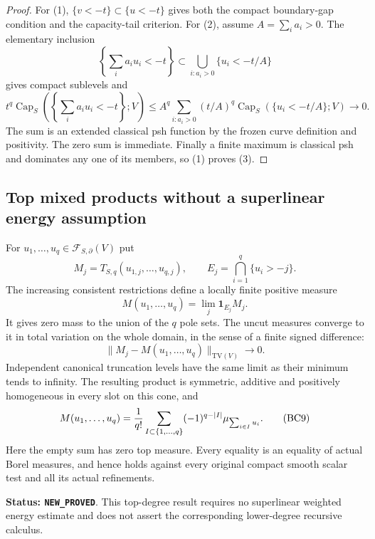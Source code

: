 \begin{proof}
For (1), $\{v<-t\}\subset\{u<-t\}$ gives both the compact
boundary-gap condition and the capacity-tail criterion.
For (2), assume $A=\sum_i a_i>0$. The elementary inclusion
\[
 \left\{\sum_i a_i u_i<-t\right\}
                  \subset\bigcup_{i:a_i>0}\{u_i<-t/A\}
 \tag{BC6}
\]
gives compact sublevels and
\[
 t^q\operatorname{Cap}_S
          \left(\left\{\sum_i a_i u_i<-t\right\};V\right)
 \leq A^q\sum_{i:a_i>0}
       (t/A)^q\operatorname{Cap}_S(\{u_i<-t/A\};V)
                       \longrightarrow0.
\]
The sum is an extended classical psh function by the frozen
curve definition and positivity. The zero sum is immediate.
Finally a finite maximum is classical psh and dominates any one
of its members, so (1) proves (3).
\end{proof}

\subsection{Top mixed products without a superlinear energy assumption}

\begin{theorem}
\label{thm:r11-boundary-mixed-top-calculus}
For $u_1,\ldots,u_q\in\mathcal F_{S,\partial}(V)$ put
\[
 M_j=T_{S,q}(u_{1,j},\ldots,u_{q,j}),\qquad
 E_j=\bigcap_{i=1}^q\{u_i>-j\}.
\]
The increasing consistent restrictions define a locally finite
positive measure
\[
            M(u_1,\ldots,u_q)=\lim_j\mathbf1_{E_j}M_j.
 \tag{BC7}
\]
It gives zero mass to the union of the $q$ pole sets. The uncut
measures converge to it in total variation on the whole domain,
in the sense of a finite signed difference:
\[
               \|M_j-M(u_1,\ldots,u_q)\|_{\mathrm{TV}(V)}
                                           \longrightarrow0.
 \tag{BC8}
\]
Independent canonical truncation levels have the same limit as
their minimum tends to infinity. The resulting product is symmetric,
additive and positively homogeneous in every slot on this cone, and
\[
 M(u_1,\ldots,u_q)
   ={1\over q!}\sum_{I\subset\{1,\ldots,q\}}
        (-1)^{q-|I|}\mu_{\sum_{i\in I}u_i}.
 \tag{BC9}
\]
Here the empty sum has zero top measure. Every equality is an
equality of actual Borel measures, and hence holds against every
original compact smooth scalar test and all its actual refinements.
\end{theorem}

\noindent\textbf{Status: \texttt{NEW\_PROVED}}. This top-degree
result requires no superlinear weighted energy estimate and does
not assert the corresponding lower-degree recursive calculus.

